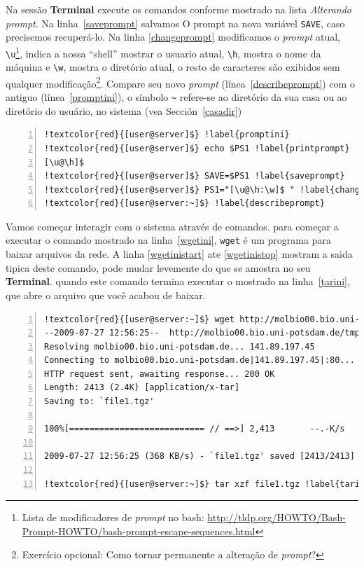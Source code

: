 \documentclass[letter,11pt]{book}
\begin{document}
Na sessão  \textbf{Terminal} execute os comandos conforme mostrado na lista \textit{Alterando prompt}. Na linha~\ref{saveprompt} salvamos O prompt na nova variável \Verb+SAVE+, caso precisemos recuperá-lo. Na linha \ref{changeprompt} modificamos o \textit{prompt} atual, \Verb+\u+\footnote{Lista de modificadores de \textit{prompt} no bash: \url{http://tldp.org/HOWTO/Bash-Prompt-HOWTO/bash-prompt-escape-sequences.html}}, indica a nossa ``shell'' mostrar o usuario atual, \Verb+\h+, mostra o nome da  máquina e \Verb+\w+, mostra o diretório atual, o resto de caracteres são exibidos sem qualquer modificação\footnote{Exercício opcional: {\textquestiondown}Como tornar permanente a alteração de \textit{prompt}?}. Compare seu novo \textit{prompt} (línea~\ref{describeprompt}) com o antiguo (línea~\ref{promptini}), o símbolo \Verb+~+ refere-se ao diretório da sua casa ou ao diretório do usuário, no sistema  (vea Sección~\ref{casadir})

\begin{Verbatim}[commandchars=!\{\},numbers=left,label=Alterando o prompt,frame=topline,fontsize=\scriptsize]
!textcolor{red}{[user@server]$} !label{promptini}
!textcolor{red}{[user@server]$} echo $PS1 !label{printprompt}
[\u@\h]$
!textcolor{red}{[user@server]$} SAVE=$PS1 !label{saveprompt}
!textcolor{red}{[user@server]$} PS1="[\u@\h:\w]$ " !label{changeprompt}
!textcolor{red}{[user@server:~]$} !label{describeprompt}
\end{Verbatim} 

Vamos começar interagir com o sistema através de comandos. para começar a executar o comando mostrado na linha~\ref{wgetini}, \Verb+wget+ é um programa para baixar arquivos da rede. A linha \ref{wgetinistart} ate \ref{wgetinistop} mostram a saida tipica deste comando, pode mudar levemente do que se amostra no seu \textbf{Terminal}. quando este comando termina executar o mostrado na linha~\ref{tarini}, que abre o arquivo que você acabou de baixar.

\begin{Verbatim}[commandchars=!\{\},numbers=left,firstnumber=last,label=Baixando arquivos, frame=topline,fontsize=\scriptsize]
!textcolor{red}{[user@server:~]$} wget http://molbio00.bio.uni-potsdam.de/tmp/file1.tgz !label{wgetini}
--2009-07-27 12:56:25--  http://molbio00.bio.uni-potsdam.de/tmp/file1.tgz !label{wgetinistart}
Resolving molbio00.bio.uni-potsdam.de... 141.89.197.45
Connecting to molbio00.bio.uni-potsdam.de|141.89.197.45|:80... connected.
HTTP request sent, awaiting response... 200 OK
Length: 2413 (2.4K) [application/x-tar]
Saving to: `file1.tgz'

100%[=========================== // ==>] 2,413       --.-K/s   in 0.006s

2009-07-27 12:56:25 (368 KB/s) - `file1.tgz' saved [2413/2413] !label{wgetinistop}

!textcolor{red}{[user@server:~]$} tar xzf file1.tgz !label{tarini}
\end{Verbatim} 
\end{document}
